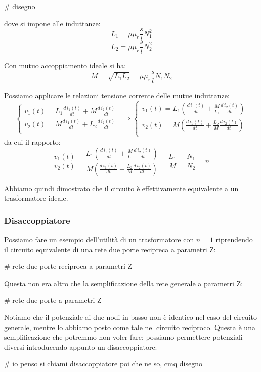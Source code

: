 \documentclass[a4paper,11pt]{article}
\begin{document}
# disegno

dove si impone alle induttanze:
$$
L_1 = \mu \mu_r \frac{s}{l} N_1^2
$$
$$
L_2 = \mu \mu_r \frac{s}{l} N_2^2
$$

Con mutuo accoppiamento ideale si ha:
$$
M = \sqrt{L_1 L_2} = \mu \mu_r \frac{s}{l} N_1 N_2 
$$

Possiamo applicare le relazioni tensione corrente delle mutue induttanze:
\[
	\begin{cases}
		v_1(t) = L_1 \frac{d\,i_1(t)}{dt} + M \frac{d\, i_2(t)}{dt} \\ 	
		v_2(t) = M \frac{d\,i_1(t)}{dt} + L_2 \frac{d\, i_2(t)}{dt} \\ 	
	\end{cases}
	\implies
	\begin{cases}
		v_1(t) = L_1 \left( \frac{d\,i_1(t)}{dt} + \frac{M}{L_1} \frac{d\, i_2(t)}{dt} \right) \\ 	
		v_2(t) = M \left( \frac{d\,i_1(t)}{dt} + \frac{L_2}{M} \frac{d\, i_2(t)}{dt} \right) \\ 	
	\end{cases}
\]
da cui il rapporto:
$$
\frac{v_1(t)}{v_2(t)} = \frac{ L_1 \left( \frac{d\,i_1(t)}{dt} + \frac{M}{L_1} \frac{d\, i_2(t)}{dt} \right)}{ M \left( \frac{d\,i_1(t)}{dt} + \frac{L_2}{M} \frac{d\, i_2(t)}{dt} \right)} = \frac{L_1}{M} = \frac{N_1}{N_2} = n
$$

Abbiamo quindi dimostrato che il circuito è effettivamente equivalente a un trasformatore ideale.

\subsubsection{Disaccoppiatore}
Possiamo fare un esempio dell'utilità di un trasformatore con $n=1$ riprendendo il circuito equivalente di una rete due porte recipreca a parametri Z:

# rete due porte reciproca a parametri Z

Questa non era altro che la semplificazione della rete generale a parametri Z:

# rete due porte a parametri Z

Notiamo che il potenziale ai due nodi in basso non è identico nel caso del circuito generale, mentre lo abbiamo posto come tale nel circuito reciproco.
Questa è una semplificazione che potremmo non voler fare: possiamo permettere potenziali diversi introducendo appunto un disaccoppiatore:

# io penso si chiami disaccoppiatore poi che ne so, cmq disegno
\end{document}
